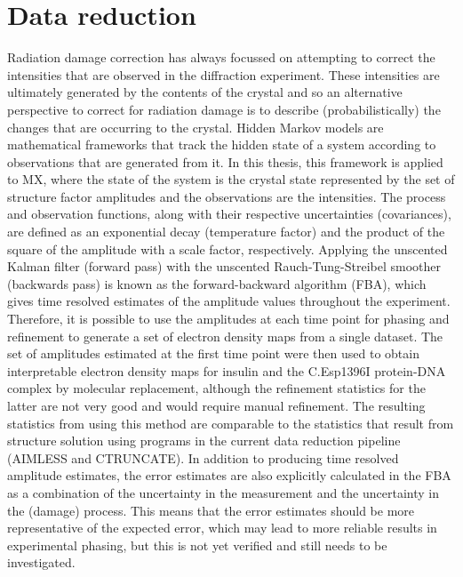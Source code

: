 \section{Data reduction}
\label{sec:Data Reduction}
Radiation damage correction has always focussed on attempting to correct the intensities that are observed in the diffraction experiment.
These intensities are ultimately generated by the contents of the crystal and so an alternative perspective to correct for radiation damage is to describe (probabilistically) the changes that are occurring to the crystal.
Hidden Markov models are mathematical frameworks that track the hidden state of a system according to observations that are generated from it.
In this thesis, this framework is applied to MX, where the state of the system is the crystal state represented by the set of structure factor amplitudes and the observations are the intensities.
The process and observation functions, along with their respective uncertainties (covariances), are defined as an exponential decay (temperature factor) and the product of the square of the amplitude with a scale factor, respectively.
Applying the unscented Kalman filter (forward pass) with the unscented Rauch-Tung-Streibel smoother (backwards pass) is known as the forward-backward algorithm (FBA), which gives time resolved estimates of the amplitude values throughout the experiment.
Therefore, it is possible to use the amplitudes at each time point for phasing and refinement to generate a set of electron density maps from a single dataset.
The set of amplitudes estimated at the first time point were then used to obtain interpretable electron density maps for insulin and the C.Esp1396I protein-DNA complex by molecular replacement, although the refinement statistics for the latter are not very good and would require manual refinement.
The resulting statistics from using this method are comparable to the statistics that result from structure solution using programs in the current data reduction pipeline (AIMLESS and CTRUNCATE).
In addition to producing time resolved amplitude estimates, the error estimates are also explicitly calculated in the FBA as a combination of the uncertainty in the measurement and the uncertainty in the (damage) process.
This means that the error estimates should be more representative of the expected error, which may lead to more reliable results in experimental phasing, but this is not yet verified and still needs to be investigated.

